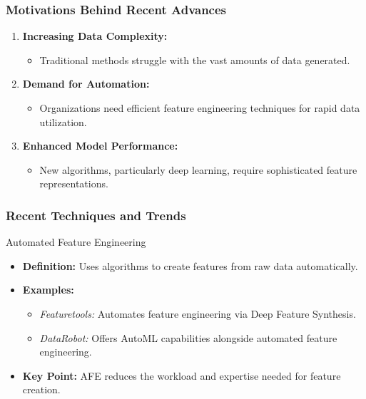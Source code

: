 \documentclass[aspectratio=169]{beamer}
\begin{document}
\begin{frame}[fragile]
    \frametitle{Motivations Behind Recent Advances}
    \begin{enumerate}
        \item \textbf{Increasing Data Complexity:} 
        \begin{itemize}
            \item Traditional methods struggle with the vast amounts of data generated.
        \end{itemize}
        \item \textbf{Demand for Automation:} 
        \begin{itemize}
            \item Organizations need efficient feature engineering techniques for rapid data utilization.
        \end{itemize}
        \item \textbf{Enhanced Model Performance:} 
        \begin{itemize}
            \item New algorithms, particularly deep learning, require sophisticated feature representations.
        \end{itemize}
    \end{enumerate}
\end{frame}

\begin{frame}[fragile]
    \frametitle{Recent Techniques and Trends}
    \begin{block}{Automated Feature Engineering}
        \begin{itemize}
            \item \textbf{Definition:} Uses algorithms to create features from raw data automatically.
            \item \textbf{Examples:}
            \begin{itemize}
                \item \textit{Featuretools:} Automates feature engineering via Deep Feature Synthesis.
                \item \textit{DataRobot:} Offers AutoML capabilities alongside automated feature engineering.
            \end{itemize}
            \item \textbf{Key Point:} AFE reduces the workload and expertise needed for feature creation.
        \end{itemize}
    \end{block}
\end{frame}
\end{document}
